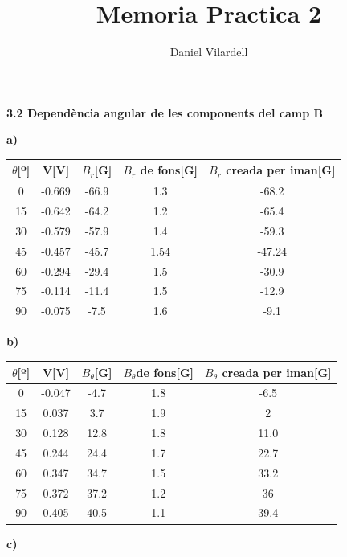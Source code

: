 \documentclass[12pt, a4papre]{article}
\author{Daniel Vilardell}
\title{\textbf{Memoria Practica 2}}
\date{}
\begin{document}
	\maketitle
	
	\textbf{3.2 Dependència angular de les components del camp B}
	
	\textbf{a)}
	
	\begin{center}
		\begin{tabular}{ |c | c  c  c  c|}
			\hline
			$\theta$[º] & V[V]	& $B_r$[G] 	& $B_r$ de fons[G] & $B_r$ creada per iman[G] \\ \hline
			0 &-0.669 		 					& -66.9  				& 1.3		&   -68.2\\ 
			15 &-0.642						& -64.2				& 1.2		&   -65.4\\
			30 & -0.579						& -57.9				&1.4		&   -59.3\\
			45 &-0.457						& -45.7				& 1.54	&   -47.24\\
			60 &-0.294 						& -29.4				& 1.5		&   -30.9\\
			75 &-0.114 						& -11.4				& 1.5		&   -12.9\\
			90 &-0.075						& -7.5				& 1.6		&   -9.1\\
			\hline
		\end{tabular}
	\end{center}
	
	\textbf{b)}
	
	\begin{center}
		\begin{tabular}{ |c | c  c  c  c|}
			\hline
			$\theta$[º] & V[V]	& $B_{\theta}$[G] 	& $B_{\theta} $de fons[G] & $B_{\theta}$ creada per iman[G] \\ \hline
			0 &-0.047	 					& -4.7  				& 1.8		&   -6.5\\ 
			15 &0.037						& 3.7					& 1.9		&   2\\
			30 & 0.128					& 12.8				&1.8		&   11.0\\
			45 &0.244						& 24.4				& 1.7		&   22.7\\
			60 &0.347						& 34.7				& 1.5		&   33.2\\
			75 &0.372 					& 37.2				& 1.2		&   36\\
			90 &0.405						& 40.5				& 1.1		&   39.4\\
			\hline
		\end{tabular}
	\end{center}
	
	\textbf{c)}
	
\end{document}
